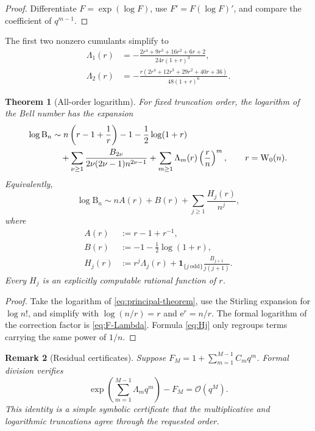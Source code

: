 \documentclass[11pt,a4paper]{article}
\newtheorem{theorem}{Theorem}[section]
\newtheorem{remark}[theorem]{Remark}
\theoremstyle{definition}
\newcommand{\Bell}{\mathrm B}
\newcommand{\W}{\mathrm W}
\newcommand{\ee}{\mathrm e}
\newcommand{\bigO}{\mathcal O}
\newcommand{\ind}{\mathbf 1}
\begin{document}
\begin{proof}
Differentiate $F=\exp(\log F)$, use $F'=F(\log F)'$, and compare the
coefficient of $q^{m-1}$.
\end{proof}

The first two nonzero cumulants simplify to
\begin{align}
 \Lambda_1(r)&=-\frac{2r^4+9r^3+16r^2+6r+2}
 {24r(1+r)^3},\label{eq:Lambda1}\\
 \Lambda_2(r)&=-\frac{r(2r^4+12r^3+29r^2+40r+36)}
 {48(1+r)^6}.\label{eq:Lambda2}
\end{align}

\begin{theorem}[All-order logarithm]\label{thm:logarithm}
For fixed truncation order, the logarithm of the Bell number has the expansion
\begin{align}
 \log\Bell_n
 &\sim n\left(r-1+\frac1r\right)-1-\frac12\log(1+r)\notag\\
 &\quad+\sum_{\nu\ge1}
 \frac{B_{2\nu}}{2\nu(2\nu-1)n^{2\nu-1}}
 +\sum_{m\ge1}\Lambda_m(r)\left(\frac rn\right)^m,
 \qquad r=\W_0(n).
 \label{eq:log-all-order}
\end{align}
Equivalently,
\begin{equation}\label{eq:log-Hj}
 \log\Bell_n\sim nA(r)+B(r)+\sum_{j\ge1}\frac{H_j(r)}{n^j},
\end{equation}
where
\begin{align}
 A(r)&:=r-1+r^{-1},\label{eq:A-r}\\
 B(r)&:=-1-\tfrac12\log(1+r),\label{eq:B-r}\\
 H_j(r)&:=r^j\Lambda_j(r)
 +\ind_{\{j\ \mathrm{odd}\}}\frac{B_{j+1}}{j(j+1)}.
 \label{eq:Hj}
\end{align}
Every $H_j$ is an explicitly computable rational function of $r$.
\end{theorem}

\begin{proof}
Take the logarithm of \eqref{eq:principal-theorem}, use the Stirling expansion
for $\log n!$, and simplify with $\log(n/r)=r$ and $\ee^r=n/r$.
The formal logarithm of the correction factor is
\eqref{eq:F-Lambda}.  Formula \eqref{eq:Hj} only regroups terms carrying the
same power of $1/n$.
\end{proof}

\begin{remark}[Residual certificates]
Suppose $F_M=1+\sum_{m=1}^{M-1}C_mq^m$.  Formal division verifies
\[
 \exp\!\left(\sum_{m=1}^{M-1}\Lambda_mq^m\right)-F_M
 =\bigO(q^M).
\]
This identity is a simple symbolic certificate that the multiplicative and
logarithmic truncations agree through the requested order.
\end{remark}
\end{document}
